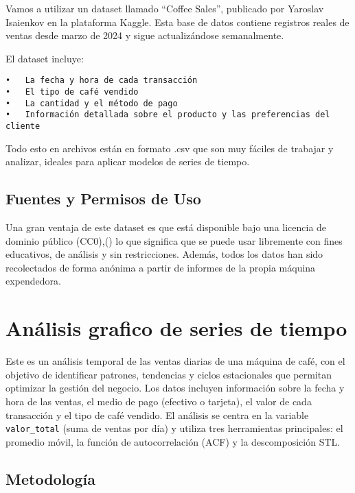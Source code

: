 \documentclass[
]{book}
\begin{document}
Vamos a utilizar un dataset llamado ``Coffee Sales'', publicado por Yaroslav Isaienkov en la plataforma Kaggle. Esta base de datos contiene registros reales de ventas desde marzo de 2024 y sigue actualizándose semanalmente.

El dataset incluye:

\begin{verbatim}
•   La fecha y hora de cada transacción
•   El tipo de café vendido
•   La cantidad y el método de pago
•   Información detallada sobre el producto y las preferencias del cliente
\end{verbatim}

Todo esto en archivos están en formato .csv que son muy fáciles de trabajar y analizar, ideales para aplicar modelos de series de tiempo.

\section{Fuentes y Permisos de Uso}\label{fuentes-y-permisos-de-uso}

Una gran ventaja de este dataset es que está disponible bajo una licencia de dominio público (CC0),(\citet{isaienkov2025}) lo que significa que se puede usar libremente con fines educativos, de análisis y sin restricciones. Además, todos los datos han sido recolectados de forma anónima a partir de informes de la propia máquina expendedora.

\chapter{Análisis grafico de series de tiempo}\label{anuxe1lisis-grafico-de-series-de-tiempo}

Este es un análisis temporal de las ventas diarias de una máquina de café, con el objetivo de identificar patrones, tendencias y ciclos estacionales que permitan optimizar la gestión del negocio. Los datos incluyen información sobre la fecha y hora de las ventas, el medio de pago (efectivo o tarjeta), el valor de cada transacción y el tipo de café vendido. El análisis se centra en la variable \texttt{valor\_total} (suma de ventas por día) y utiliza tres herramientas principales: el promedio móvil, la función de autocorrelación (ACF) y la descomposición STL.

\section{Metodología}\label{metodologuxeda}
\end{document}
